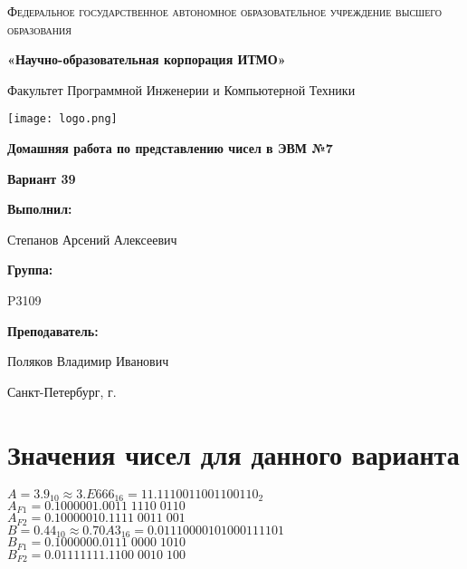 \documentclass[12pt,a4paper]{report}
\begin{document}
\begin{titlepage}
    \centering
    {
        \scshape
        Федеральное государственное автономное образовательное учреждение высшего образования
        \par
        \textbf{«Научно-образовательная корпорация ИТМО»}
        \par
        \vspace*{1cm}
        Факультет Программной Инженерии и Компьютерной Техники
        \par
    }
    \vspace*{0.6cm}
    \texttt{[image: logo.png]}
    {
        \Large
        \textbf{Домашняя работа по представлению чисел в ЭВМ №7}
        \par
        \normalsize
        \vspace*{0.75cm}
        \textbf{Вариант 39}
        \par
    }
    \vfill
    \hfill\begin{minipage}{\dimexpr\textwidth-7.8cm}
        \textbf{Выполнил:}\par
        Степанов Арсений Алексеевич\par
        \vspace*{0.15cm}
        \textbf{Группа:}\par
        P3109\par
        \vspace*{0.15cm}
        \textbf{Преподаватель:}\par
        Поляков Владимир Иванович\par
    \end{minipage}
    \vfill
    Санкт-Петербург, \the\year{}г.
\end{titlepage}
\onehalfspacing
\section*{Значения чисел для данного варианта}
$A=3.9_{10}\approx3.E666_{16}=11.1110011001100110_2$\\
$A_{F1}=0.1000001.0011\;1110\;0110$\\
$A_{F2}=0.10000010.1111\;0011\;001$\\
$B=0.44_{10}\approx0.70A3_{16}=0.01110000101000111101$\\
$B_{F1}=0.1000000.0111\;0000\;1010$\\
$B_{F2}=0.01111111.1100\;0010\;100$
\end{document}
